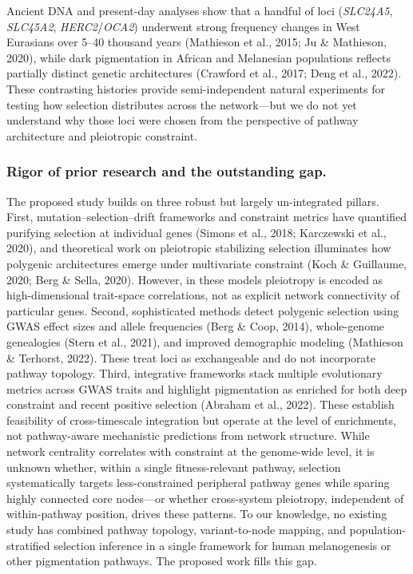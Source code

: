 \documentclass[11pt]{article}
\begin{document}
Ancient DNA and present-day analyses show that a handful of loci (\emph{SLC24A5}, \emph{SLC45A2}, \emph{HERC2}/\emph{OCA2}) underwent strong frequency changes in West Eurasians over 5--40 thousand years (Mathieson et al., 2015; Ju \& Mathieson, 2020), while dark pigmentation in African and Melanesian populations reflects partially distinct genetic architectures (Crawford et al., 2017; Deng et al., 2022). These contrasting histories provide semi-independent natural experiments for testing how selection distributes across the network---but we do not yet understand why those loci were chosen from the perspective of pathway architecture and pleiotropic constraint.

\subsubsection{Rigor of prior research and the outstanding gap.}
The proposed study builds on three robust but largely un-integrated pillars. First, mutation--selection--drift frameworks and constraint metrics have quantified purifying selection at individual genes (Simons et al., 2018; Karczewski et al., 2020), and theoretical work on pleiotropic stabilizing selection illuminates how polygenic architectures emerge under multivariate constraint (Koch \& Guillaume, 2020; Berg \& Sella, 2020). However, in these models pleiotropy is encoded as high-dimensional trait-space correlations, not as explicit network connectivity of particular genes. Second, sophisticated methods detect polygenic selection using GWAS effect sizes and allele frequencies (Berg \& Coop, 2014), whole-genome genealogies (Stern et al., 2021), and improved demographic modeling (Mathieson \& Terhorst, 2022). These treat loci as exchangeable and do not incorporate pathway topology. Third, integrative frameworks stack multiple evolutionary metrics across GWAS traits and highlight pigmentation as enriched for both deep constraint and recent positive selection (Abraham et al., 2022). These establish feasibility of cross-timescale integration but operate at the level of enrichments, not pathway-aware mechanistic predictions from network structure. While network centrality correlates with constraint at the genome-wide level, it is unknown whether, within a single fitness-relevant pathway, selection systematically targets less-constrained peripheral pathway genes while sparing highly connected core nodes---or whether cross-system pleiotropy, independent of within-pathway position, drives these patterns. To our knowledge, no existing study has combined pathway topology, variant-to-node mapping, and population-stratified selection inference in a single framework for human melanogenesis or other pigmentation pathways. The proposed work fills this gap.
\end{document}
